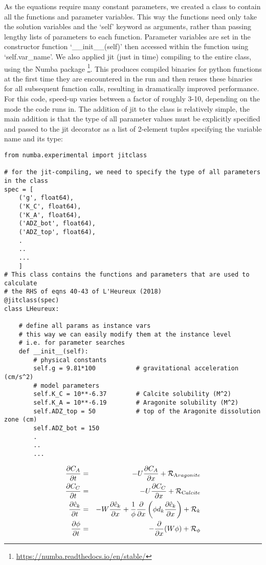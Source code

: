 \documentclass[a4paper]{article}
\newcommand{\nn}{\nonumber}
\begin{document}
As the equations require many constant parameters, we created a class to contain all the functions and parameter variables.  This way the functions need only take the solution variables and the `self' keyword as arguments, rather than passing lengthy lists of parameters to each function.  Parameter variables are set in the constructor function `\_\_init\_\_(self)' then accessed within the function using `self.var\_name'.  We also applied jit (just in time) compiling to the entire class, using the Numba package \footnote{\url{https://numba.readthedocs.io/en/stable/}}.  This produces compiled binaries for python functions at the first time they are encountered in the run and then reuses these binaries for all subsequent function calls, resulting in dramatically improved performance.  For this code, speed-up varies between a factor of roughly 3-10, depending on the mode the code runs in.  The addition of jit to the class is relatively simple, the main addition is that the type of all parameter values must be explicitly specified and passed to the jit decorator as a list of 2-element tuples specifying the variable name and its type:
\begin{lstlisting}
from numba.experimental import jitclass

# for the jit-compiling, we need to specify the type of all parameters in the class
spec = [
    ('g', float64),
    ('K_C', float64),
    ('K_A', float64),
    ('ADZ_bot', float64),
    ('ADZ_top', float64),
    .
    ..
    ...
    ]
# This class contains the functions and parameters that are used to calculate
# the RHS of eqns 40-43 of L'Heureux (2018)
@jitclass(spec)
class LHeureux:
    
    # define all params as instance vars
    # this way we can easily modify them at the instance level
    # i.e. for parameter searches
    def __init__(self):
        # physical constants
        self.g = 9.81*100           # gravitational acceleration (cm/s^2)
        # model parameters
        self.K_C = 10**-6.37        # Calcite solubility (M^2)
        self.K_A = 10**-6.19        # Aragonite solubility (M^2)
        self.ADZ_top = 50           # top of the Aragonite dissolution zone (cm)
        self.ADZ_bot = 150
        .
        ..
        ...
\end{lstlisting}

\begin{eqnarray}
\frac{\partial C_A}{\partial t} &=& -U \frac{\partial C_A}{\partial x}  + {\cal R}_{\text Aragonite}
\nn\\
\frac{\partial C_C}{\partial t} &=& -U \frac{\partial C_C}{\partial x}  + {\cal R}_{\text Calcite} 
\nn\\
\frac{\partial \hat{c}_k}{\partial t} &=& -W \frac{\partial \hat{c}_k}{\partial x}
+\frac{1}{\phi} \frac{\partial}{\partial x} \left( \phi d_k \frac{\partial \hat{c}_k}{\partial x} \right)
+{\cal R}_{k}
\nn\\ 
\frac{\partial \phi}{\partial t} &=& -\frac{\partial}{\partial x} (W \phi) +{\cal R}_\phi
\end{eqnarray}
\end{document}
